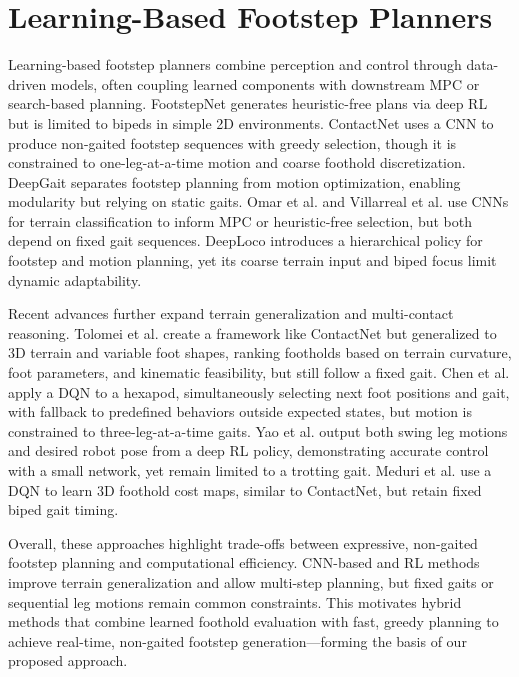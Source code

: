 \section{Learning-Based Footstep Planners}
\label{sec:background-learning-based-footstep-planners}

Learning-based footstep planners combine perception and control
through data-driven models, often coupling learned components with
downstream MPC or search-based planning. FootstepNet
\cite{gaspard_footstepnet_2024} generates heuristic-free plans via
deep RL but is limited to bipeds in simple 2D environments.
ContactNet \cite{bratta_contactnet_2024} uses a CNN to produce
non-gaited footstep sequences with greedy selection, though it is
constrained to one-leg-at-a-time motion and coarse foothold
discretization. DeepGait \cite{tsounis_deepgait_2020} separates
footstep planning from motion optimization, enabling modularity but
relying on static gaits. Omar et al. \cite{omar_fast_2022} and
Villarreal et al. \cite{villarreal_fast_2019} use CNNs for terrain
classification to inform MPC or heuristic-free selection, but both
depend on fixed gait sequences. DeepLoco \cite{peng_deeploco_2017}
introduces a hierarchical policy for footstep and motion planning,
yet its coarse terrain input and biped focus limit dynamic adaptability.

Recent advances further expand terrain generalization and
multi-contact reasoning. Tolomei et al.
\cite{tolomei_learning-based_2025} create a framework like ContactNet
but generalized to 3D terrain and variable foot shapes, ranking
footholds based on terrain curvature, foot parameters, and kinematic
feasibility, but still follow a fixed gait. Chen et al.
\cite{chen_gait_2024} apply a DQN to a hexapod, simultaneously
selecting next foot positions and gait, with fallback to predefined
behaviors outside expected states, but motion is constrained to
three-leg-at-a-time gaits. Yao et al. \cite{yao_hierarchical_2021}
output both swing leg motions and desired robot pose from a deep RL
policy, demonstrating accurate control with a small network, yet
remain limited to a trotting gait. Meduri et al.
\cite{meduri_deepq_2021} use a DQN to learn 3D foothold
cost maps, similar to ContactNet, but retain fixed biped gait timing.

Overall, these approaches highlight trade-offs between expressive,
non-gaited footstep planning and computational efficiency. CNN-based
and RL methods improve terrain generalization and allow multi-step
planning, but fixed gaits or sequential leg motions remain common
constraints. This motivates hybrid methods that combine learned
foothold evaluation with fast, greedy planning to achieve real-time,
non-gaited footstep generation—forming the basis of our proposed approach.
